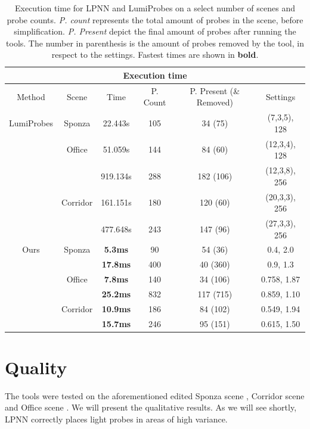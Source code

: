 \begin{table}
	\centering
\begin{tabular}{ |c||c|c|c|c|c|  }
	\hline
	\multicolumn{6}{|c|}{Execution time} \\
	\hline
	Method & Scene & Time & P. Count & P. Present (\& Removed) & Settings\\
	\hline
	LumiProbes & Sponza   & 22.443s  & 105 & 34 (75)  & (7,3,5), 128 \\
	\cline{2-6}
	           & Office   & 51.059s  & 144 & 84 (60)  & (12,3,4), 128\\
	           &          & 919.134s & 288 & 182 (106)& (12,3,8), 256\\
	\cline{2-6}
	           & Corridor & 161.151s & 180 & 120 (60) & (20,3,3), 256\\
	           &          & 477.648s & 243 & 147 (96) & (27,3,3), 256\\
	\hline
	\hline
	Ours       & Sponza   & \textbf{5.3ms}  & 90  & 54 (36)   & 0.4, 2.0 \\
			   &          & \textbf{17.8ms} & 400 & 40 (360)  & 0.9, 1.3 \\
	\cline{2-6}
			   & Office   & \textbf{7.8ms}  & 140 & 34 (106)  & 0.758, 1.87 \\
               &          & \textbf{25.2ms} & 832 & 117 (715) & 0.859, 1.10 \\
    \cline{2-6}
    		   & Corridor & \textbf{10.9ms} & 186 & 84 (102)  & 0.549, 1.94 \\
               &          & \textbf{15.7ms} & 246 & 95 (151)  & 0.615, 1.50 \\
               
	\hline
\end{tabular}
\caption{Execution time for LPNN and LumiProbes on a select number of scenes and probe counts. \textit{P. count} represents the total amount of probes in the scene, before simplification. \textit{P. Present} depict the final amount of probes after running the tools. The number in parenthesis is the amount of probes removed by the tool, in respect to the settings. Fastest times are shown in \textbf{bold}.}
\label{table:times}
\end{table}

\section{Quality}
\label{sec:4_quality}
The tools were tested on the aforementioned edited Sponza scene \parencite{Sponza2017}, Corridor scene \parencite{Corridor2021} and Office scene \parencite{Office2021}. We will present the qualitative results. As we will see shortly, LPNN correctly places light probes in areas of high variance.


